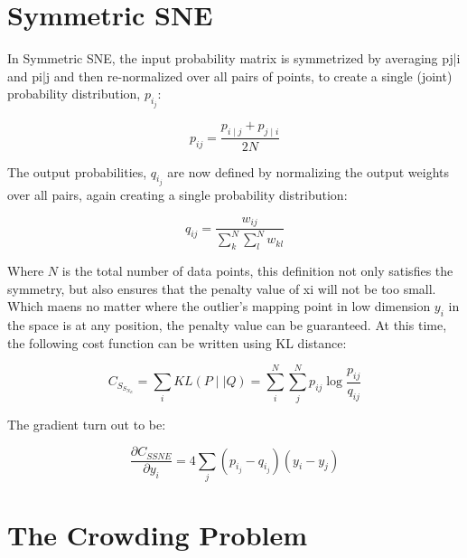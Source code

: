 \section{Symmetric SNE}
In Symmetric SNE, the input probability matrix is symmetrized by averaging pj|i and pi|j and then re-normalized over all pairs of points, to create a single (joint) probability distribution, $p_i_j$:

\begin{equation*}
    {p_{i j}} = \frac {p_{i\mid j} + p_{j\mid i}} {2N}
\end{equation*}

\noindent The output probabilities, $q_i_j$ are now defined by normalizing the output weights over all pairs, again creating a single probability distribution:

\begin{equation*}
    {q_{i j}} = \frac {w_{i j}} {\sum_k^N \sum_l^N w_{k l}}
\end{equation*}

\noindent Where $N$ is the total number of data points, this definition not only satisfies the symmetry, but also ensures that the penalty value of xi will not be too small. Which maens no matter where the outlier's mapping point in low dimension $y_i$ in the space is at any position, the penalty value can be guaranteed. At this time, the following cost function can be written using KL distance:

\begin{equation*}
    {C_S_S_N_E} = {\sum_i KL(P \mid \mid Q)} =  { {\sum_i^N} {\sum_j^N} {p_{i j}} \log \frac{p_{i j}}{q_{i j}} }
\end{equation*}

\noindent The gradient turn out to be: 

\begin{equation*}
\frac{\partial C_{SSNE}}{\partial y_i} = 4\sum_j(p_i_j - q_i_j)(y_i - y_j)
\end{equation*}




\section{The Crowding Problem}

